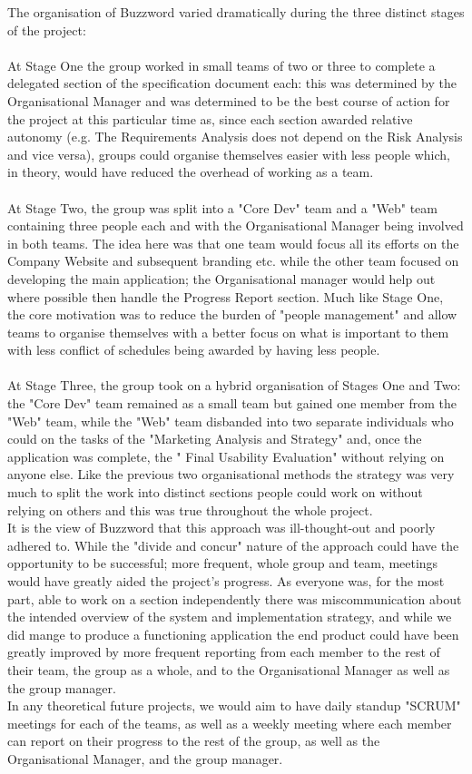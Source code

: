 \documentclass[11pt, oneside, a4paper]{report}   %
\begin{document}
The organisation of Buzzword varied dramatically during the three distinct stages of the project:  \\ \\
At Stage One the group worked in small teams of two or three to complete a delegated section of the 
specification document each: this was determined by the Organisational Manager and was 
determined to be the best course of action for the project at this particular time as, since each section awarded 
relative autonomy (e.g. The Requirements Analysis does not depend on the Risk Analysis and vice versa), groups 
could organise themselves easier with less people which, in theory, would have reduced the overhead of working as a team. \\ \\
At Stage Two, the group was split into a "Core Dev" team and a "Web" team containing three people each and with the Organisational
Manager being involved in both teams. The idea here was that one team would focus all its efforts on the Company Website and subsequent 
branding etc. while the other team focused on developing the main application; the Organisational manager would help out where possible 
then handle the Progress Report section. Much like Stage One, the core motivation was to reduce the burden of "people management" and 
allow teams to organise themselves with a better focus on what is important to them with less conflict of schedules being awarded by having less
people.\\ \\
At Stage Three, the group took on a hybrid organisation of Stages One and Two: the "Core Dev" team remained as a small team but gained one
member from the "Web" team, while the "Web" team disbanded into two separate individuals who could on the tasks of the "Marketing Analysis and Strategy"
and, once the application was complete, the " Final Usability Evaluation" without relying on anyone else. Like the previous two organisational methods 
the strategy was very much to split the work into distinct sections people could work on without relying on others and this was true throughout the whole project.\\ 

It is the view of Buzzword that this approach was ill-thought-out and poorly adhered to. While the "divide and concur" nature of the approach could have the 
opportunity to be successful; more frequent, whole group and team, meetings would have greatly aided the project's progress. 
As everyone was, for the most part, able to work on a section independently there was miscommunication about the intended overview of the system and 
implementation strategy, and while we did mange to produce a functioning application the end product could have been greatly improved by more 
frequent reporting from each member to the rest of their team, the group as a whole, and to the Organisational Manager as well as the group manager.\\ 
In any theoretical future projects, we would aim to have daily standup "SCRUM" meetings for each of the teams, as well as a weekly meeting where each member
can report on their progress to the rest of the group, as well as the Organisational Manager, and the group manager.  
\end{document}
